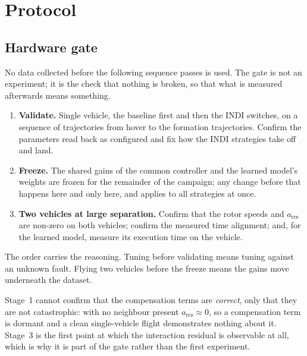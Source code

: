\section{Protocol}
\label{sec:setup-protocol}

\subsection{Hardware gate}
\label{sec:setup-gate}

No data collected before the following sequence passes is used. The gate is not an experiment; it
is the check that nothing is broken, so that what is measured afterwards means something.

\begin{enumerate}
  \item \textbf{Validate.} Single vehicle, the baseline first and then the INDI switches, on a
        sequence of trajectories from hover to the formation trajectories. Confirm the parameters
        read back as configured and fix how the INDI strategies take off and land.
  \item \textbf{Freeze.} The shared gains of the common controller and the learned model's
        weights are frozen for the remainder of the campaign; any change before that happens here
        and only here, and applies to all strategies at once.
  \item \textbf{Two vehicles at large separation.} Confirm that the rotor speeds and
        $a_{\mathrm{res}}$ are non-zero on both vehicles; confirm the measured time alignment; and,
        for the learned model, measure its execution time on the vehicle.
\end{enumerate}

The order carries the reasoning. Tuning before validating means tuning against an unknown fault.
Flying two vehicles before the freeze means the gains move underneath the dataset.

Stage~1 cannot confirm that the compensation terms are \emph{correct}, only that they are not
catastrophic: with no neighbour present $a_{\mathrm{res}} \approx 0$, so a compensation term is
dormant and a clean single-vehicle flight demonstrates nothing about it. Stage~3 is the first point
at which the interaction residual is observable at all, which is why it is part of the gate rather
than the first experiment.

